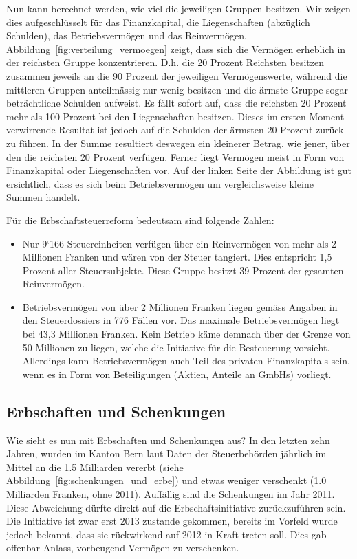 \documentclass[a4paper, 12pt,liststotoc]{scrartcl}
\numberwithin{equation}{section}
\begin{document}
Nun kann berechnet werden, wie viel die jeweiligen Gruppen besitzen. Wir
zeigen dies aufgeschlüsselt für das Finanzkapital, die Liegenschaften
(abzüglich Schulden), das Betriebsvermögen und das Reinvermögen. Abbildung~\ref{fig:verteilung_vermoegen}
 zeigt, dass sich die Vermögen erheblich in der reichsten Gruppe
konzentrieren. D.h. die 20 Prozent Reichsten besitzen zusammen jeweils
an die 90 Prozent der jeweiligen Vermögenswerte, während die mittleren
Gruppen anteilmässig nur wenig besitzen und die ärmste Gruppe sogar
beträchtliche Schulden aufweist. Es fällt sofort auf, dass die reichsten
20 Prozent mehr als 100 Prozent bei den Liegenschaften besitzen. Dieses
im ersten Moment verwirrende Resultat ist jedoch auf die Schulden der
ärmsten 20 Prozent zurück zu führen. In der Summe resultiert deswegen
ein kleinerer Betrag, wie jener, über den die reichsten 20 Prozent
verfügen. Ferner liegt Vermögen meist in Form von Finanzkapital oder
Liegenschaften vor. Auf der linken Seite der Abbildung ist gut ersichtlich,
dass es sich beim Betriebsvermögen um vergleichsweise kleine Summen
handelt.

Für die Erbschaftsteuerreform bedeutsam sind folgende Zahlen:

\begin{itemize}
\item
  Nur 9`166 Steuereinheiten verfügen über ein Reinvermögen von mehr als
  2 Millionen Franken und wären von der Steuer tangiert. Dies entspricht
  1,5 Prozent aller Steuersubjekte. Diese Gruppe besitzt 39 Prozent der
  gesamten Reinvermögen.
\item
  Betriebsvermögen von über 2 Millionen Franken liegen gemäss Angaben in
  den Steuerdossiers in 776 Fällen vor. Das maximale Betriebsvermögen
  liegt bei 43,3 Millionen Franken. Kein Betrieb käme demnach über der
  Grenze von 50 Millionen zu liegen, welche die Initiative für die
  Besteuerung vorsieht. Allerdings kann Betriebsvermögen auch Teil des
  privaten Finanzkapitals sein, wenn es in Form von Beteiligungen
  (Aktien, Anteile an GmbHs) vorliegt.
\end{itemize}

\subsection{ Erbschaften und Schenkungen
    }\label{erbschaften-und-schenkungen}

Wie sieht es nun mit Erbschaften und Schenkungen aus? In den letzten
zehn Jahren, wurden im Kanton Bern laut Daten der Steuerbehörden
jährlich im Mittel an die 1.5 Milliarden vererbt (siehe Abbildung~\ref{fig:schenkungen_und_erbe}) und etwas weniger
verschenkt (1.0 Milliarden Franken, ohne 2011). Auffällig sind die
Schenkungen im Jahr 2011. Diese Abweichung dürfte direkt auf die
Erbschaftsinitiative zurückzuführen sein. Die Initiative ist zwar erst
2013 zustande gekommen, bereits im Vorfeld wurde jedoch bekannt, dass
sie rückwirkend auf 2012 in Kraft treten soll. Dies gab offenbar Anlass,
vorbeugend Vermögen zu verschenken.
\end{document}
